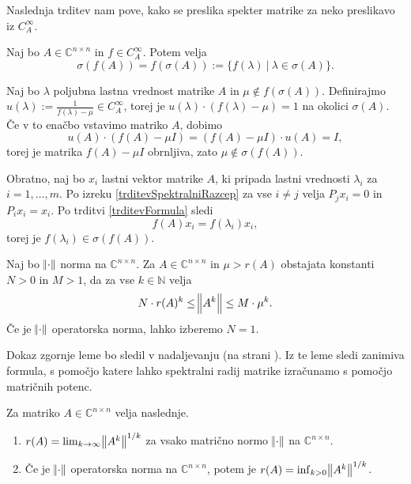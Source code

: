 \documentclass[mat1]{fmfdelo}
\newcommand{\N}{\mathbb N}
\newcommand{\C}{\mathbb C}
\begin{document}
Naslednja trditev nam pove, kako se preslika spekter matrike za neko preslikavo iz $C_A^\infty$.
\begin{izrek} \label{izrekOPreslikaviSpektra}
    Naj bo $A \in \C^{n \times n}$ in $f \in C_A^\infty$. Potem velja
    \begin{equation*}
        \sigma\left(f\left(A\right)\right) = f\left(\sigma\left(A\right)\right) := \{f(\lambda)\ |\ \lambda \in \sigma(A)\}.
    \end{equation*}
\end{izrek}
\begin{dokaz}
    Naj bo $\lambda$ poljubna lastna vrednost matrike $A$ in $\mu \notin f(\sigma(A))$. Definirajmo $u(\lambda) := \frac{1}{f(\lambda) - \mu} \in C_A^\infty$, torej je $u(\lambda) \cdot (f(\lambda) - \mu) = 1$ na okolici $\sigma(A)$. Če v to enačbo vstavimo matriko $A$, dobimo
    \begin{equation*}
        u(A) \cdot (f(A) - \mu I) = (f(A) - \mu I) \cdot u(A) = I,
    \end{equation*}
    torej je matrika $f(A) - \mu I$ obrnljiva, zato $\mu \notin \sigma(f(A))$.
    
    Obratno, naj bo $x_i$ lastni vektor matrike $A$, ki pripada lastni vrednosti $\lambda_i$ za $i = 1, \ldots, m$. Po izreku \ref{trditevSpektralniRazcep} za vse $i \neq j$ velja $P_j x_i = 0$ in $P_i x_i = x_i$. Po trditvi \ref{trditevFormula} sledi
    \begin{equation*}
        f(A) x_i = f(\lambda_i) x_i,
    \end{equation*}
    torej je $f(\lambda_i) \in \sigma(f(A))$.
\end{dokaz}

\begin{lema}\label{lemaNorme}
    Naj bo $\norm{\cdot}$ norma na $\C^{n \times n}$. Za $A \in \C^{n \times n}$ in $\mu > r(A)$ obstajata konstanti $N > 0$ in $M > 1$, da za vse $k \in \N$ velja
    \begin{equation*}\label{eqLemaNorme}
        N \cdot r(A)^k \leq \norm{A^k} \leq M \cdot \mu^k.
    \end{equation*}
    Če je $\norm{\cdot}$ operatorska norma, lahko izberemo $N = 1$.
\end{lema}
Dokaz zgornje leme bo sledil v nadaljevanju (na strani \pageref{dokazLemaNorme}). Iz te leme sledi zanimiva formula, s pomočjo katere lahko spektralni radij matrike izračunamo s pomočjo matričnih potenc.
\begin{trditev}  \label{gelfand}
    Za matriko $A \in \C^{n \times n}$ velja naslednje.
    \begin{enumerate}
        \item $r(A) = \lim_{k \rightarrow \infty} \norm{A^k}^{1/k}$ za vsako matrično normo $\norm{\cdot}$ na $\C^{n \times n}$.
        \item Če je $\norm{\cdot}$ operatorska norma na $\C^{n \times n}$, potem je $r(A) = \inf_{k > 0} \norm{A^k}^{1/k}$.
    \end{enumerate}
\end{trditev}
\end{document}

